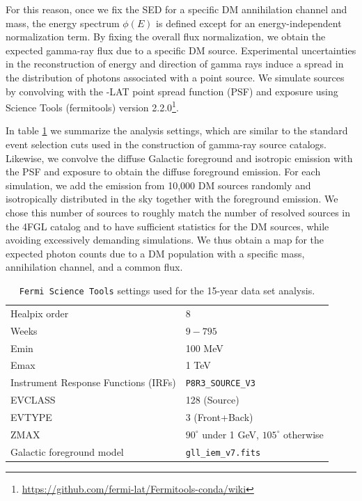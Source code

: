 For this reason, once we fix the SED for a specific DM annihilation channel and mass, the energy spectrum $\phi(E)$ is defined except for an energy-independent normalization term. 
By fixing the overall flux normalization, we obtain the expected gamma-ray flux due to a specific DM source. 
Experimental uncertainties in the reconstruction of energy and direction of gamma rays induce a spread in the distribution of photons associated with a point source.
We simulate sources by convolving with the \Fermi-LAT point spread function (PSF) and exposure
using {\Fermi} Science Tools (fermitools) version 2.2.0\footnote{\url{https://github.com/fermi-lat/Fermitools-conda/wiki}}.

In table \ref{tab:halos:settings} we summarize the analysis settings, which are similar to the standard event selection cuts used in the construction of gamma-ray source catalogs. 
Likewise, we convolve the diffuse Galactic foreground and isotropic emission with the PSF and exposure to obtain the diffuse foreground emission.
For each simulation, we add the emission from 10,000 DM sources randomly and isotropically distributed in the sky together with the foreground emission. We chose this number of sources to roughly match the number of resolved sources in the 4FGL catalog and to have sufficient statistics for the DM sources, while avoiding excessively demanding simulations. We thus obtain a map for the expected photon counts due to a DM population with a specific mass, annihilation channel, and a common flux.

\begin{table}[t]
\centering
\begin{tabular}{ | l| l|  }
\hline
Healpix order & 8\\ 
Weeks & $9-795$\\ 
Emin & 100 MeV\\
Emax & 1 TeV\\
Instrument Response Functions (IRFs) & \texttt{P8R3\_SOURCE\_V3} \\
EVCLASS & 128 (Source)\\ 
EVTYPE & 3 (Front+Back)\\
ZMAX & $90^\circ$ under 1 GeV, $105^\circ$ otherwise\\
Galactic foreground model & \verb|gll_iem_v7.fits| \\
\hline
\end{tabular}
\caption{\texttt{Fermi Science Tools} settings used for the 15-year data set analysis.}
\label{tab:halos:settings}
\end{table}

